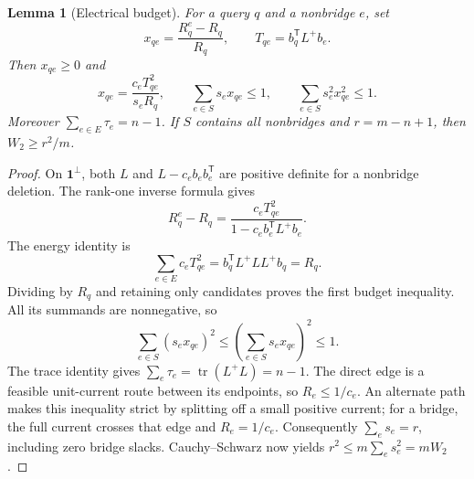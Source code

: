 \documentclass[11pt,letterpaper]{article}
\newtheorem{lemma}[theorem]{Lemma}
\newcommand{\one}{\mathbf 1}
\DeclareMathOperator{\tr}{tr}
\begin{document}
\begin{lemma}[Electrical budget]\label{lem:budget}
For a query $q$ and a nonbridge $e$, set
\[
 x_{qe}=\frac{R_q^e-R_q}{R_q},\qquad
 T_{qe}=b_q^{\mathsf T}L^+b_e.
\]
Then $x_{qe}\ge0$ and
\[
 x_{qe}=\frac{c_eT_{qe}^2}{s_eR_q},\qquad
 \sum_{e\in S}s_ex_{qe}\le1,\qquad
 \sum_{e\in S}s_e^2x_{qe}^2\le1.
\]
Moreover $\sum_{e\in E}\tau_e=n-1$. If $S$ contains all nonbridges and $r=m-n+1$, then $W_2\ge r^2/m$.
\end{lemma}
\begin{proof}
On $\one^\perp$, both $L$ and $L-c_eb_eb_e^{\mathsf T}$ are positive definite for a nonbridge deletion. The rank-one inverse formula gives
\[
 R_q^e-R_q=\frac{c_eT_{qe}^2}{1-c_eb_e^{\mathsf T}L^+b_e}.
\]
The energy identity is
\[
 \sum_{e\in E}c_eT_{qe}^2
 =b_q^{\mathsf T}L^+LL^+b_q=R_q.
\]
Dividing by $R_q$ and retaining only candidates proves the first budget inequality. All its summands are nonnegative, so
\[
 \sum_{e\in S}(s_ex_{qe})^2
 \le\left(\sum_{e\in S}s_ex_{qe}\right)^2\le1.
\]
The trace identity gives $\sum_e\tau_e=\tr(L^+L)=n-1$. The direct edge is a feasible unit-current route between its endpoints, so $R_e\le1/c_e$. An alternate path makes this inequality strict by splitting off a small positive current; for a bridge, the full current crosses that edge and $R_e=1/c_e$. Consequently $\sum_es_e=r$, including zero bridge slacks. Cauchy--Schwarz now yields $r^2\le m\sum_es_e^2=mW_2$.
\end{proof}
\end{document}

